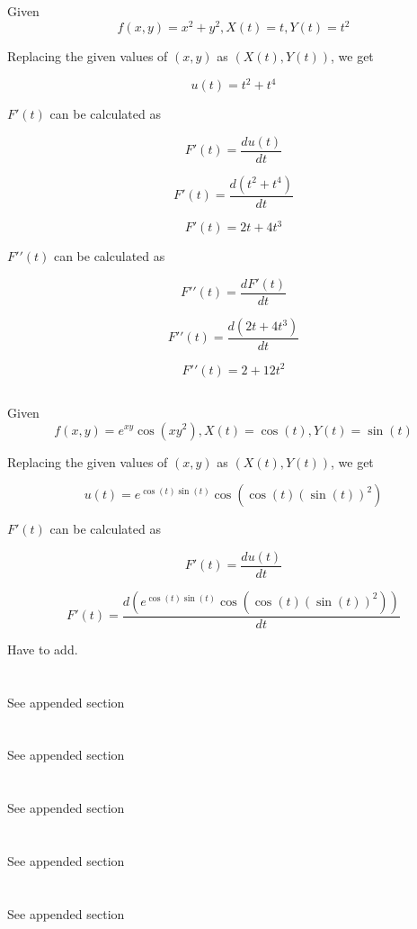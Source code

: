 \documentclass[11pt]{article}
\begin{document}
Given $$f(x,y) = x^{2} + y^{2} , X(t) = t, Y(t) = t^{2}$$

Replacing the given values of $(x,y)$ as $(X(t),Y(t))$, we get

$$u(t) = t^{2} + t^{4}$$

$F\prime(t)$ can be calculated as

$$F\prime(t) = \frac{du(t)}{dt}$$

$$F\prime(t) = \frac{d(t^{2} + t^{4})}{dt}$$

$$F\prime(t) = 2t + 4t^{3}$$

$F\prime\prime(t)$ can be calculated as

$$F\prime\prime(t) = \frac{dF\prime(t)}{dt}$$

$$F\prime\prime(t) = \frac{d(2t + 4t^{3})}{dt}$$

$$F\prime\prime(t) = 2 + 12t^{2}$$

\subsection{}

Given $$f(x,y) = e^{xy}\cos(xy^{2}), X(t) = \cos(t), Y(t) = \sin(t)$$

Replacing the given values of $(x,y)$ as $(X(t),Y(t))$, we get

$$u(t) = e^{\cos(t)\sin(t)}\cos(\cos(t)(\sin(t))^{2})$$

$F\prime(t)$ can be calculated as

$$F\prime(t) = \frac{du(t)}{dt}$$

$$F\prime(t) = \frac{d(e^{\cos(t)\sin(t)}\cos(\cos(t)(\sin(t))^{2}))}{dt}$$

Have to add.

\section{}
See appended section 
\section{}
See appended section
\section{}
See appended section
\section{}
See appended section
\section{}
See appended section
\end{document}
